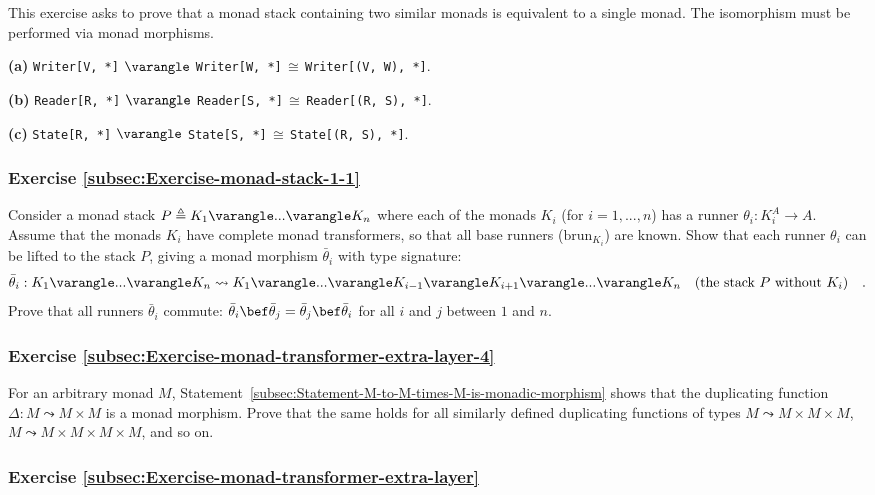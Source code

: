 This exercise asks to prove that a monad stack containing two similar
monads is equivalent to a single monad. The isomorphism must be performed
via monad morphisms.

\textbf{(a)}  \lstinline!Writer[V, *]! $\varangle$ \lstinline!Writer[W, *]!$\,\cong\,$\lstinline!Writer[(V, W), *]!.

\textbf{(b)} \lstinline!Reader[R, *]! $\varangle$ \lstinline!Reader[S, *]!$\,\cong\,$\lstinline!Reader[(R, S), *]!.

\textbf{(c)} \lstinline!State[R, *]! $\varangle$ \lstinline!State[S, *]!$\,\cong\,$\lstinline!State[(R, S), *]!.

\subsubsection{Exercise \label{subsec:Exercise-monad-stack-1-1}\ref{subsec:Exercise-monad-stack-1-1}}

Consider a monad stack $P\triangleq K_{1}\varangle...\varangle K_{n}$
where each of the monads $K_{i}$ (for $i=1,...,n$) has a runner
$\theta_{i}:K_{i}^{A}\rightarrow A$. Assume that the monads $K_{i}$
have complete monad transformers, so that all base runners ($\text{brun}_{K_{i}}$)
are known. Show that each runner $\theta_{i}$ can be lifted to the
stack $P$, giving a monad morphism $\bar{\theta}_{i}$ with type
signature:
\[
\bar{\theta}_{i}:K_{1}\varangle...\varangle K_{n}\leadsto K_{1}\varangle...\varangle K_{i-1}\varangle K_{i+1}\varangle...\varangle K_{n}\quad\text{(the stack }P\text{ without }K_{i})\quad.
\]
Prove that all runners $\bar{\theta}_{i}$ commute: $\bar{\theta}_{i}\bef\bar{\theta}_{j}=\bar{\theta}_{j}\bef\bar{\theta}_{i}$
for all $i$ and $j$ between $1$ and $n$.

\subsubsection{Exercise \label{subsec:Exercise-monad-transformer-extra-layer-4}\ref{subsec:Exercise-monad-transformer-extra-layer-4} }

For an arbitrary monad $M$, Statement~\ref{subsec:Statement-M-to-M-times-M-is-monadic-morphism}
shows that the duplicating function $\Delta:M\leadsto M\times M$
is a monad morphism. Prove that the same holds for all similarly defined
duplicating functions of types $M\leadsto M\times M\times M$, $M\leadsto M\times M\times M\times M$,
and so on.

\subsubsection{Exercise \label{subsec:Exercise-monad-transformer-extra-layer}\ref{subsec:Exercise-monad-transformer-extra-layer}}

